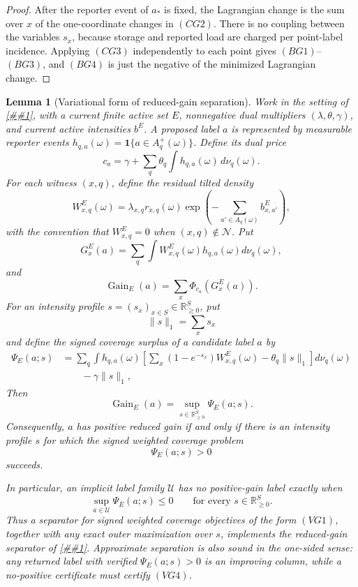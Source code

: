 \documentclass[10pt]{article}
\newcommand{\cref}[1]{\ref{##1}}
\newtheorem{lemma}[theorem]{Lemma}
\theoremstyle{definition}
\begin{document}
\begin{proof}
   After the reporter event of \(a_*\) is fixed, the Lagrangian change is the
   sum over \(x\) of the one-coordinate changes in \((CG2)\).  There is no
   coupling between the variables \(s_x\), because storage and reported load are
   charged per point-label incidence.  Applying \((CG3)\) independently to each
   point gives \((BG1)\)--\((BG3)\), and \((BG4)\) is just the negative of the
   minimized Lagrangian change.
\end{proof}

\begin{lemma}[Variational form of reduced-gain separation]
   \label{lem:reduced-gain-variational-separation}
   Work in the setting of \cref{lem:finite-rate-coverage-convex}, with a
   current finite active set \(E\), nonnegative dual multipliers
   \((\lambda,\theta,\gamma)\), and current active intensities \(b^E\).  A
   proposed label \(a\) is represented by measurable reporter events
   \(h_{q,a}(\omega)=\mathbf 1\{a\in A_q^+(\omega)\}\).  Define its dual price
   \[
      c_a=\gamma+\sum_q\theta_q\int h_{q,a}(\omega)\,d\nu_q(\omega).
   \]
   For each witness \((x,q)\), define the residual tilted density
   \[
      W^E_{x,q}(\omega)
      =
      \lambda_{x,q}r_{x,q}(\omega)
      \exp\!\left(
         -\sum_{a'\in A_q(\omega)}b^E_{x,a'}
      \right),
      \tag{VG0}
   \]
   with the convention that \(W^E_{x,q}=0\) when \((x,q)\notin\mathcal N\).
   Put
   \[
      G_x^E(a)=
      \sum_q\int W^E_{x,q}(\omega)h_{q,a}(\omega)d\nu_q(\omega),
   \]
   and
   \[
      \operatorname{Gain}_E(a)=\sum_x\Phi_{c_a}(G_x^E(a)).
   \]
   For an intensity profile \(s=(s_x)_{x\in S}\in\mathbb R_{\ge0}^S\), put
   \[
      \|s\|_1=\sum_xs_x
   \]
   and define the signed coverage surplus of a candidate label \(a\) by
   \[
   \begin{aligned}
      \Psi_E(a;s)
      &=
      \sum_q
      \int
      h_{q,a}(\omega)
      \left[
         \sum_x(1-e^{-s_x})W^E_{x,q}(\omega)
         -\theta_q\|s\|_1
      \right]d\nu_q(\omega)  \\
      &\qquad -\gamma\|s\|_1 ,
   \end{aligned}
      \tag{VG1}
   \]
   Then
   \[
      \operatorname{Gain}_E(a)
      =
      \sup_{s\in\mathbb R_{\ge0}^S}\Psi_E(a;s).
      \tag{VG2}
   \]
   Consequently, \(a\) has positive reduced gain if and only if there is an
   intensity profile \(s\) for which the signed weighted coverage problem
   \[
      \Psi_E(a;s)>0
      \tag{VG3}
   \]
   succeeds.

   In particular, an implicit label family \(\mathcal U\) has no positive-gain
   label exactly when
   \[
      \sup_{a\in\mathcal U}\Psi_E(a;s)\le0
      \qquad\text{for every }s\in\mathbb R_{\ge0}^S .
      \tag{VG4}
   \]
   Thus a separator for signed weighted coverage objectives of the form
   \((VG1)\), together with any exact outer maximization over \(s\), implements
   the reduced-gain separator of
   \cref{lem:implicit-reduced-gain-separation}.  Approximate separation is also
   sound in the one-sided sense: any returned label with verified
   \(\Psi_E(a;s)>0\) is an improving column, while a no-positive certificate
   must certify \((VG4)\).
\end{lemma}
\end{document}
